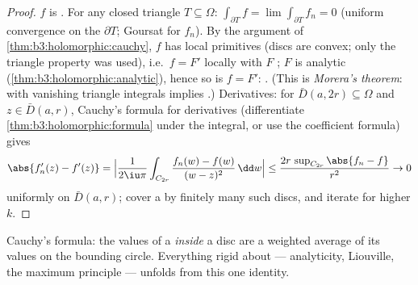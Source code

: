 \begin{proof}
$f$ is . For any closed triangle $T \subseteq
\Omega$: $\int_{\partial T}f = \lim\int_{\partial T}f_n = 0$
(uniform convergence on the  $\partial T$; Goursat for
$f_n$). By the argument of \cref{thm:b3:holomorphic:cauchy},
$f$ has local primitives (discs are convex; only the triangle
property was used), i.e.\ $f = F'$ locally with $F$
; $F$ is analytic
(\cref{thm:b3:holomorphic:analytic}), hence so is $f = F'$:
. (This is \emph{Morera's
theorem}:  with vanishing
triangle integrals implies .) Derivatives: for
$\bar D(a, 2r) \subseteq \Omega$ and $z \in \bar D(a, r)$,
Cauchy's formula for derivatives (differentiate
\cref{thm:b3:holomorphic:formula} under the integral, or use
the coefficient formula) gives
\[
\abs{f_n'(z) - f'(z)} =
\Bigl|\frac{1}{2\iu\pi}\int_{C_{2r}}\frac{f_n(w) - f(w)}{(w -
z)^2}\,\dd w\Bigr|
\leq \frac{2r\,\sup_{C_{2r}}\abs{f_n - f}}{r^2} \to 0
\]
uniformly on $\bar D(a,r)$; cover a  by finitely many
such discs, and iterate for higher $k$.
\end{proof}

\begin{omfigure}

{\small Cauchy's formula: the values of a 
\emph{inside} a disc are a weighted average of its values on
the bounding circle. Everything rigid about  ---
analyticity, Liouville, the maximum principle --- unfolds from
this one identity.}
\end{omfigure}

